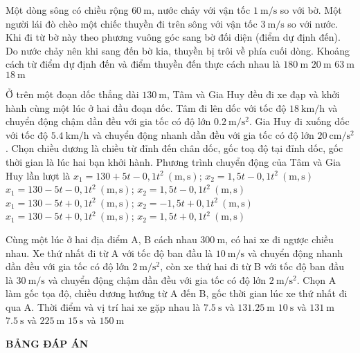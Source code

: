 \begin{ex}
	Một dòng sông có chiều rộng $\SI{60}{\meter}$, nước chảy với vận tốc $\SI{1}{\meter/\second}$ so với bờ. Một người lái đò chèo một chiếc thuyền đi trên sông với vận tốc $\SI{3}{\meter/\second}$ so với nước. Khi đi từ bờ này theo phương vuông góc sang bờ đối diện (điểm dự định đến). Do nước chảy nên khi sang đến bờ kia, thuyền bị trôi về phía cuối dòng. Khoảng cách từ điểm dự định đến và điểm thuyền đến thực cách nhau là
	\choice
	{$\SI{180}{\meter}$}
	{\True $\SI{20}{\meter}$}
	{$\SI{63}{\meter}$}
	{$\SI{18}{\meter}$}
	\loigiai{}
\end{ex}
\begin{ex}
Ở trên một đoạn dốc thẳng dài $\SI{130}{\meter}$, Tâm và Gia Huy đều đi xe đạp và khởi hành cùng một lúc ở hai đầu đoạn dốc. Tâm đi lên dốc với tốc độ $\SI{18}{\kilo\meter/\hour}$ và chuyển động chậm dần đều với gia tốc có độ lớn $\SI{0.2}{\meter/\second^2}$. Gia Huy đi xuống dốc với tốc độ $\SI{5.4}{\kilo\meter/\hour}$ và chuyển động nhanh dần đều với gia tốc có độ lớn $\SI{20}{\centi\meter/\second^2}$. Chọn chiều dương là chiều từ đỉnh đến chân dốc, gốc toạ độ tại đỉnh dốc, gốc thời gian là lúc hai bạn khởi hành. Phương trình chuyển động của Tâm và Gia Huy lần lượt là 
	\choice
	{$x_1=130+5t-0,1t^2\ \left(\si{\meter}, \si{\second}\right)$;  $x_2=1,5t-0,1t^2\ \left(\si{\meter}, \si{\second}\right)$}
	{$x_1=130-5t-0,1t^2\ \left(\si{\meter}, \si{\second}\right)$;  $x_2=1,5t-0,1t^2\ \left(\si{\meter}, \si{\second}\right)$}
	{$x_1=130-5t+0,1t^2\ \left(\si{\meter}, \si{\second}\right)$;  $x_2=-1,5t+0,1t^2\ \left(\si{\meter}, \si{\second}\right)$}
	{\True $x_1=130-5t+0,1t^2\ \left(\si{\meter}, \si{\second}\right)$;  $x_2=1,5t+0,1t^2\ \left(\si{\meter}, \si{\second}\right)$}
	\loigiai{}
\end{ex}

\begin{ex}
	Cùng một lúc ở hai địa điểm A, B cách nhau $\SI{300}{\meter}$, có hai xe đi ngược chiều nhau. Xe thứ nhất đi từ A với tốc độ ban đầu là $\SI{10}{\meter/\second}$ và chuyển động nhanh dần đều với gia tốc có độ lớn $\SI{2}{\meter/\second^2}$, còn xe thứ hai đi từ B với tốc độ ban đầu là $\SI{30}{\meter/\second}$ và chuyển động chậm dần đều với gia tốc có độ lớn $\SI{2}{\meter/\second^2}$. Chọn A làm gốc tọa độ, chiều dương hướng từ A đến B, gốc thời gian lúc xe thứ nhất đi qua A. Thời điểm và vị trí hai xe gặp nhau là
	\choice
	{\True $\SI{7.5}{\second}$ và $\SI{131.25}{\meter}$}
	{$\SI{10}{\second}$ và $\SI{131}{\meter}$}
	{$\SI{7.5}{\second}$ và $\SI{225}{\meter}$}
	{$\SI{15}{\second}$ và $\SI{150}{\meter}$}
	\loigiai{}
\end{ex}

\newpage
\begin{center}
	\textbf{BẢNG ĐÁP ÁN}
\end{center}
